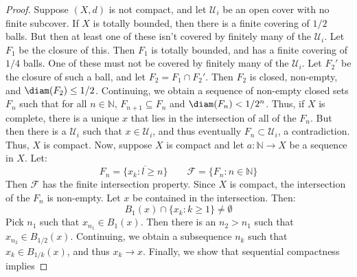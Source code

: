\documentclass[crop=false,class=article,oneside]{standalone}
\begin{document}
            \begin{proof}
                Suppose $(X,d)$ is not compact, and let
                $\mathcal{U}_{i}$ be an open cover with no finite
                subcover. If $X$ is totally bounded, then there is a
                finite covering of $1/2$ balls. But then at least one
                of these isn't covered by finitely many of the
                $\mathcal{U}_{i}$. Let $F_{1}$ be the closure of this.
                Then $F_{1}$ is totally bounded, and has a finite
                covering of $1/4$ balls. One of these must not be
                covered by finitely many of the $\mathcal{U}_{i}$.
                Let $F_{2}'$ be the closure of such a ball, and let
                $F_{2}=F_{1}\cap{F}_{2}'$. Then $F_{2}$ is closed,
                non-empty, and $\diam(F_{2})\leq{1/2}$. Continuing, we
                obtain a sequence of non-empty closed sets $F_{n}$ such
                that for all $n\in\mathbb{N}$, $F_{n+1}\subseteq{F}_{n}$
                and $\diam(F_{n})<1/2^{n}$. Thus, if $X$ is complete,
                there is a unique $x$ that lies in the intersection
                of all of the $F_{n}$. But then there is a
                $\mathcal{U}_{i}$ such that $x\in\mathcal{U}_{i}$,
                and thus eventually $F_{n}\subset\mathcal{U}_{i}$,
                a contradiction. Thus, $X$ is compact. Now, suppose
                $X$ is compact and let $a:\mathbb{N}\rightarrow{X}$
                be a sequence in $X$. Let:
                \begin{equation}
                    F_{n}=\overline{\{x_{k}:l\geq{n}\}}
                    \quad\quad
                    \mathscr{F}=\{F_{n}:n\in\mathbb{N}\}
                \end{equation}
                Then $\mathscr{F}$ has the finite intersection
                property. Since $X$ is compact, the intersection of
                the $F_{n}$ is non-empty. Let $x$ be contained in
                the intersection. Then:
                \begin{equation}
                    B_{1}(x)\cap\{x_{k}:k\geq{1}\}\ne\emptyset
                \end{equation}
                Pick $n_{1}$ such that $x_{n_{1}}\in{B}_{1}(x)$.
                Then there is an $n_{2}>n_{1}$ such that
                $x_{n_{2}}\in{B}_{1/2}(x)$. Continuing, we obtain a
                subsequence $n_{k}$ such that
                $x_{k}\in{B}_{1/k}(x)$, and thus $x_{k}\rightarrow{x}$.
                Finally, we show that sequential compactness implies

\end{proof}
\end{document}
